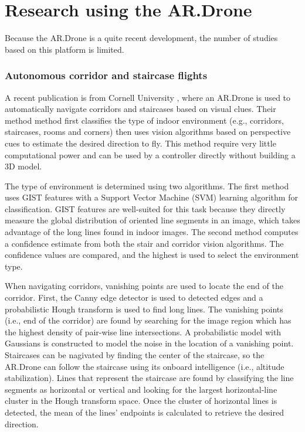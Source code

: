 \section{Research using the AR.Drone}
Because the AR.Drone is a quite recent development, the number of studies based on this platform is limited.

\subsubsection{Autonomous corridor and staircase flights}

A recent publication is from Cornell University \cite{Bills2011icra}, where an AR.Drone is used to automatically navigate corridors and staircases based on visual clues.
Their method method first classifies the type of indoor environment (e.g., corridors, staircases, rooms and corners) then uses vision algorithms based on perspective cues to estimate the desired direction to fly.
This method require very little computational power and can be used by a controller directly without building a 3D model.

The type of environment is determined using two algorithms.
The first method uses GIST features \cite{oliva2001modeling} with a Support Vector Machine (SVM) learning algorithm for classification.
GIST features are well-suited for this task because they directly measure the global distribution of oriented line segments in an image, which takes advantage of the long lines found in indoor images.
The second method computes a confidence estimate from both the stair and corridor vision algorithms.
The confidence values are compared, and the highest is used to select the environment type.

When navigating corridors, vanishing points are used to locate the end of the corridor. 
First, the Canny edge detector is used to detected edges and a probabilistic Hough transform is used to find long lines.
The vanishing points (i.e., end of the corridor) are found by searching for the image region which has the highest density of pair-wise line intersections.
A probabilistic model with Gaussians is constructed to model the noise in the location of a vanishing point.
Staircases can be nagivated by finding the center of the staircase, so the AR.Drone can follow the staircase using its onboard intelligence (i.e., altitude stabilization).
Lines that represent the staircase are found by classifying the line segments as horizontal or vertical and looking for the largest horizontal-line cluster in the Hough transform space.
Once the cluster of horizontal lines is detected, the mean of the lines' endpoints is calculated to retrieve the desired direction.

